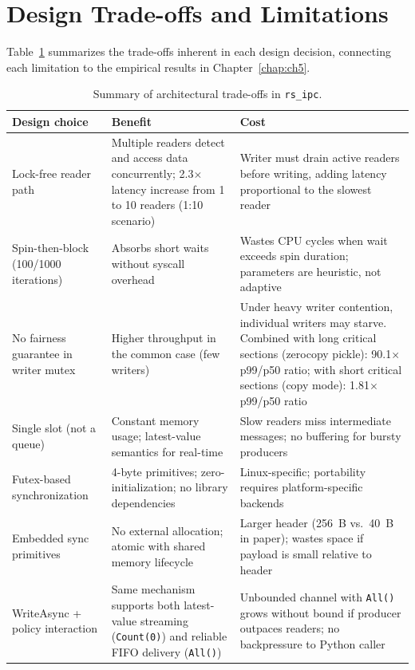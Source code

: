 \bigskip
\section{Design Trade-offs and Limitations}
\label{sec:tradeoffs}

Table~\ref{tab:tradeoffs} summarizes the trade-offs inherent in each design decision, connecting each limitation to the empirical results in Chapter~\ref{chap:ch5}.

\begin{table}[htbp]
    \centering
    \caption{Summary of architectural trade-offs in \texttt{rs\_ipc}.}
    \label{tab:tradeoffs}
    \small
    \begin{tabular}{>{\raggedright}p{3.2cm}>{\raggedright}p{5cm}>{\raggedright\arraybackslash}p{5cm}}
        \toprule
        \textbf{Design choice} & \textbf{Benefit} & \textbf{Cost} \\
        \midrule
        Lock-free reader path & Multiple readers detect and access data concurrently; 2.3$\times$ latency increase from 1 to 10 readers (1:10 scenario) & Writer must drain active readers before writing, adding latency proportional to the slowest reader \\
        Spin-then-block (100/1000 iterations) & Absorbs short waits without syscall overhead & Wastes CPU cycles when wait exceeds spin duration; parameters are heuristic, not adaptive \\
        No fairness guarantee in writer mutex & Higher throughput in the common case (few writers) & Under heavy writer contention, individual writers may starve. Combined with long critical sections (zerocopy pickle): 90.1$\times$ p99/p50 ratio; with short critical sections (copy mode): 1.81$\times$ p99/p50 ratio \\
        Single slot (not a queue) & Constant memory usage; latest-value semantics for real-time & Slow readers miss intermediate messages; no buffering for bursty producers \\
        Futex-based synchronization & 4-byte primitives; zero-initialization; no library dependencies & Linux-specific; portability requires platform-specific backends \\
        Embedded sync primitives & No external allocation; atomic with shared memory lifecycle & Larger header (256~B vs.\ 40~B in paper); wastes space if payload is small relative to header \\
        WriteAsync + policy interaction & Same mechanism supports both latest-value streaming (\texttt{Count(0)}) and reliable FIFO delivery (\texttt{All()}) & Unbounded channel with \texttt{All()} grows without bound if producer outpaces readers; no backpressure to Python caller \\
        \bottomrule
    \end{tabular}
\end{table}

